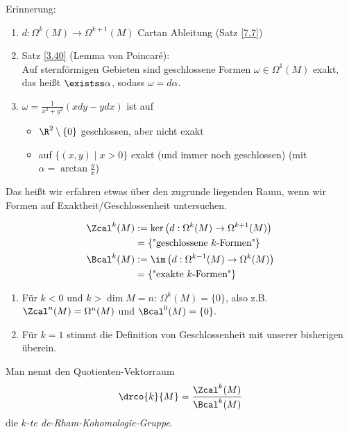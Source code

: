 \lecture

Erinnerung: \begin{enumerate}[label={\roman*})]
	\item $ d: \Omega^k(M) \to \Omega^{k+1}(M) $ Cartan Ableitung (Satz \ref{7.7})
	\item Satz \ref{3.40} (Lemma von Poincaré):\\
		Auf sternförmigen Gebieten sind geschlossene Formen $\omega \in \Omega^1(M)$ exakt, das heißt $\existss \alpha$, sodass $\omega = d\alpha$.
	\item \label{erinnerung} $ \omega = \frac{1}{x^2+y^2}(xdy - ydx) $ ist auf
		\begin{itemize}
			\item $\R^2 \setminus \{0\}$ geschlossen, aber nicht exakt
			\item auf $\{(x,y) \mid x>0\}$ exakt (und immer noch geschlossen) (mit $\alpha = \arctan \frac{y}{x}$)
		\end{itemize}
\end{enumerate}

Das heißt wir erfahren etwas über den zugrunde liegenden Raum, wenn wir Formen auf Exaktheit/Geschlossenheit untersuchen.

\begin{defn}
	\begin{align*}
		\Zcal^k(M) &:= \ker \left( d: \Omega^k(M) \to \Omega^{k+1}(M) \right)\\
			&= \{ \text{"geschlossene $k$-Formen"} \}\\
		\Bcal^k(M) &:= \im \left( d: \Omega^{k-1}(M) \to \Omega^k(M) \right)\\
			&= \{ \text{"exakte $k$-Formen"} \}
	\end{align*}
\end{defn}

\begin{rem*}
	\begin{enumerate}[label={\roman*})]
		\item Für $k<0$ und $k>\dim M = n$: $ \Omega^k(M) = \{0\} $, also z.B. $ \Zcal^n(M) = \Omega^n(M) $ und $ \Bcal^0(M) = \{0\}. $
		\item Für $k=1$ stimmt die Definition von Geschlossenheit mit unserer bisherigen überein.
	\end{enumerate}
\end{rem*}

\begin{defn}
	Man nennt den Quotienten-Vektorraum
	\[ \drco{k}{M} = \frac{\Zcal^k(M)}{\Bcal^k(M)} \]
	die \emph{$k$-te de-Rham-Kohomologie-Gruppe}.
\end{defn}

